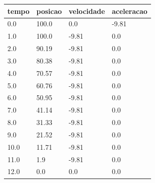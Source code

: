 \begin{tabular}{llll}
\toprule
tempo & posicao & velocidade & aceleracao \\
\midrule
0.0 & 100.0 & 0.0 & -9.81 \\
1.0 & 100.0 & -9.81 & 0.0 \\
2.0 & 90.19 & -9.81 & 0.0 \\
3.0 & 80.38 & -9.81 & 0.0 \\
4.0 & 70.57 & -9.81 & 0.0 \\
5.0 & 60.76 & -9.81 & 0.0 \\
6.0 & 50.95 & -9.81 & 0.0 \\
7.0 & 41.14 & -9.81 & 0.0 \\
8.0 & 31.33 & -9.81 & 0.0 \\
9.0 & 21.52 & -9.81 & 0.0 \\
10.0 & 11.71 & -9.81 & 0.0 \\
11.0 & 1.9 & -9.81 & 0.0 \\
12.0 & 0.0 & 0.0 & 0.0 \\
\bottomrule
\end{tabular}
